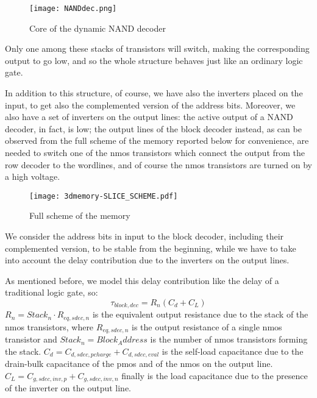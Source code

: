 \begin{center}
	\begin{figure}[H]
		\centering
		\texttt{[image: NANDdec.png]}
		\caption{Core of the dynamic NAND decoder}
	\end{figure}
\end{center}

Only one among these stacks of transistors will switch, making the corresponding output to go low, and so the whole structure behaves just like an ordinary logic gate.

In addition to this structure, of course, we have also the inverters placed on the input, to get also the complemented version of the address bits. Moreover, we also have a set of inverters on the output lines: the active output of a NAND decoder, in fact, is low; the output lines of the block decoder instead, as can be observed from the full scheme of the memory reported below for convenience, are needed to switch one of the nmos transistors which connect the output from the row decoder to the wordlines, and of course the nmos transistors are turned on by a high voltage. 

\begin{center}
	\begin{figure}[H]
		\centering
		\texttt{[image: 3dmemory-SLICE\_SCHEME.pdf]}
		\caption{Full scheme of the memory}
	\end{figure}
\end{center}

We consider the address bits in input to the block decoder, including their complemented version, to be stable from the beginning, while we have to take into account the delay contribution due to the inverters on the output lines. 

As mentioned before, we model this delay contribution like the delay of a traditional logic gate, so:
$$\tau_{block,dec}=R_n(C_d+C_L)$$
$R_n=Stack_n\cdot R_{eq,sdec,n}$ is the equivalent output resistance due to the stack of the nmos transistors, where $R_{eq,sdec,n}$ is the output resistance of a single nmos transistor and $Stack_n=Block_Address$ is the number of nmos transistors forming the stack. $C_d=C_{d,sdec,pcharge}+C_{d,sdec,eval}$ is the self-load capacitance due to the drain-bulk capacitance of the pmos and of the nmos on the output line. $C_L=C_{g,sdec,inv,p}+C_{g,sdec,inv,n}$ finally is the load capacitance due to the presence of the inverter on the output line. \\


